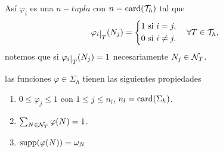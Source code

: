 As\'i $\varphi_{i}$ es una $n-tupla$ con $n=\mathop{\rm card}({\mathcal{T}}_{h})$ tal que 
\begin{equation*}
\varphi_{i}\restr{T}(N_{j})= \left\{ \begin{aligned}
1  \text{ si } i=j,\\
0 \text{ si } i\neq j .
\end{aligned}
 \right. \quad \forall T\in \mct_{h},
\end{equation*}
notemos que si $\varphi_{i}\restr{T}(N_{j})=1$ necesariamente $N_{j}\in {\ensuremath{\mathcal{N}}}_{T}$.
\begin{lema}
las funciones $\varphi \in \Sigma_{h} $ tienen las siguientes propiedades
\begin{enumerate}[{\rm (i)}]
	\item $0\leq \varphi_{j} \leq 1$ con $1\leq j\leq n_{l}$, $n_{l}=\mathop{\rm card}(\Sigma_{h})$. 
	\item $\sum_{N\in{\ensuremath{\mathcal{N}}}_{T}} \varphi(N)=1$.
	\item $\operatorname{supp}(\varphi(N))=\omega_{N}$
\end{enumerate}
\end{lema}
